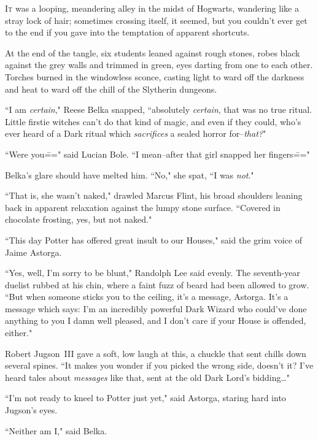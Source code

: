 
\lettrine{I}{t} was a looping, meandering alley in the midst of Hogwarts, wandering like a stray lock of hair; sometimes crossing itself, it seemed, but you couldn't ever get to the end if you gave into the temptation of apparent shortcuts.

At the end of the tangle, six students leaned against rough stones, robes black against the grey walls and trimmed in green, eyes darting from one to each other. Torches burned in the windowless sconce, casting light to ward off the darkness and heat to ward off the chill of the Slytherin dungeons.

``I am \emph{certain}," Reese Belka snapped, ``absolutely \emph{certain}, that was no true ritual. Little firstie witches can't do that kind of magic, and even if they could, who's ever heard of a Dark ritual which \emph{sacrifices} a sealed horror for\---\emph{that?}"

``Were you\===" said Lucian Bole. ``I mean\---after that girl snapped her fingers\==="

Belka's glare should have melted him. ``No," she spat, ``I was \emph{not}."

``That is, she wasn't naked," drawled Marcus Flint, his broad shoulders leaning back in apparent relaxation against the lumpy stone surface. ``Covered in chocolate frosting, yes, but not naked."

``This day Potter has offered great insult to our Houses," said the grim voice of Jaime Astorga.

``Yes, well, I'm sorry to be blunt," Randolph Lee said evenly. The seventh-year duelist rubbed at his chin, where a faint fuzz of beard had been allowed to grow. ``But when someone sticks you to the ceiling, it's a message, Astorga. It's a message which says: I'm an incredibly powerful Dark Wizard who could've done anything to you I damn well pleased, and I don't care if your House is offended, either."

Robert Jugson~III gave a soft, low laugh at this, a chuckle that sent chills down several spines. ``It makes you wonder if you picked the wrong side, doesn't it? I've heard tales about \emph{messages} like that, sent at the old Dark Lord's bidding{\ldots}"

``I'm not ready to kneel to Potter just yet," said Astorga, staring hard into Jugson's eyes.

``Neither am I," said Belka.

